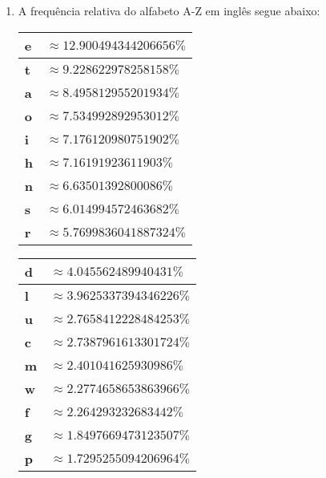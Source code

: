 \documentclass{article}
\begin{document}
\begin{enumerate}

    \item A frequência relativa do alfabeto A-Z em inglês segue abaixo:

    \begin{center}
        \begin{minipage}{.32\linewidth}
            \begin{tabular}{>{\bfseries}ll}
                \hline
                e & $\approx 12.900494344206656\%$     \\ \hline
                t & $\approx 9.228622978258158\%$      \\ \hline
                a & $\approx 8.495812955201934\%$      \\ \hline
                o & $\approx 7.534992892953012\%$      \\ \hline
                i & $\approx 7.176120980751902\%$      \\ \hline
                h & $\approx 7.16191923611903\%$       \\ \hline
                n & $\approx 6.63501392800086\%$       \\ \hline
                s & $\approx 6.014994572463682\%$      \\ \hline
                r & $\approx 5.7699836041887324\%$     \\ \hline
            \end{tabular}
        \end{minipage}
        \begin{minipage}{.33\linewidth}
            \begin{tabular}{>{\bfseries}ll}
                \hline
                d & $\approx 4.045562489940431\%$      \\ \hline
                l & $\approx 3.9625337394346226\%$     \\ \hline
                u & $\approx 2.7658412228484253\%$     \\ \hline
                c & $\approx 2.7387961613301724\%$     \\ \hline
                m & $\approx 2.401041625930986\%$      \\ \hline
                w & $\approx 2.2774658653863966\%$     \\ \hline
                f & $\approx 2.264293232683442\%$      \\ \hline
                g & $\approx 1.8497669473123507\%$     \\ \hline
                p & $\approx 1.7295255094206964\%$     \\ \hline

\end{tabular}
\end{minipage}
\end{center}
\end{enumerate}
\end{document}
